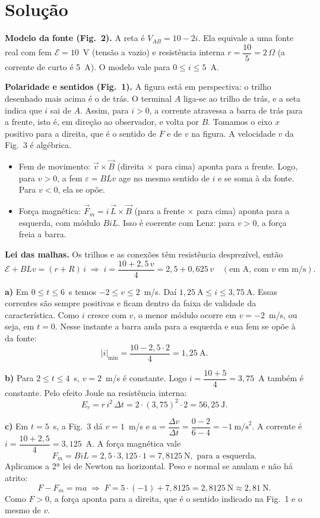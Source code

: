 \documentclass{article}%
\begin{document}
\section*{Solução}

\textbf{Modelo da fonte (Fig.~2).} A reta é $V_{AB}=10-2i$. Ela equivale a uma fonte real com fem $\mathcal{E}=10$~V (tensão a vazio) e resistência interna $r=\dfrac{10}{5}=2\,\Omega$ (a corrente de curto é 5~A). O modelo vale para $0\le i\le 5$~A.

\textbf{Polaridade e sentidos (Fig.~1).} A figura está em perspectiva: o trilho desenhado mais acima é o de trás. O terminal $A$ liga-se ao trilho de trás, e a seta indica que $i$ sai de $A$. Assim, para $i>0$, a corrente atravessa a barra de trás para a frente, isto é, em direção ao observador, e volta por $B$. Tomamos o eixo $x$ positivo para a direita, que é o sentido de $F$ e de $v$ na figura. A velocidade $v$ da Fig.~3 é algébrica.
\begin{itemize}
\item Fem de movimento: $\vec v\times\vec B$ (direita $\times$ para cima) aponta para a frente. Logo, para $v>0$, a fem $\varepsilon=BLv$ age no mesmo sentido de $i$ e se soma à da fonte. Para $v<0$, ela se opõe.
\item Força magnética: $\vec F_m=i\,\vec L\times\vec B$ (para a frente $\times$ para cima) aponta para a esquerda, com módulo $BiL$. Isso é coerente com Lenz: para $v>0$, a força freia a barra.
\end{itemize}
\textbf{Lei das malhas.} Os trilhos e as conexões têm resistência desprezível, então
\[
\mathcal{E}+BLv=(r+R)\,i\;\Rightarrow\; i=\frac{10+2{,}5\,v}{4}=2{,}5+0{,}625\,v \quad (\text{em A, com } v \text{ em m/s}).
\]

\textbf{a)} Em $0\le t\le 6$~s temos $-2\le v\le 2$~m/s. Daí $1{,}25\ \text{A}\le i\le 3{,}75\ \text{A}$. Essas correntes são sempre positivas e ficam dentro da faixa de validade da característica. Como $i$ cresce com $v$, o menor módulo ocorre em $v=-2$~m/s, ou seja, em $t=0$. Nesse instante a barra anda para a esquerda e sua fem se opõe à da fonte:
\[
|i|_{\min}=\frac{10-2{,}5\cdot 2}{4}=1{,}25\ \text{A}.
\]

\textbf{b)} Para $2\le t\le 4$~s, $v=2$~m/s é constante. Logo $i=\dfrac{10+5}{4}=3{,}75$~A também é constante. Pelo efeito Joule na resistência interna:
\[
E_r=r\,i^2\,\Delta t=2\cdot(3{,}75)^2\cdot 2=56{,}25\ \text{J}.
\]

\textbf{c)} Em $t=5$~s, a Fig.~3 dá $v=1$~m/s e $a=\dfrac{\Delta v}{\Delta t}=\dfrac{0-2}{6-4}=-1\ \text{m/s}^2$. A corrente é $i=\dfrac{10+2{,}5}{4}=3{,}125$~A. A força magnética vale
\[
F_m=BiL=2{,}5\cdot 3{,}125\cdot 1=7{,}8125\ \text{N}, \text{ para a esquerda.}
\]
Aplicamos a 2ª lei de Newton na horizontal. Peso e normal se anulam e não há atrito:
\[
F-F_m=ma\;\Rightarrow\;F=5\cdot(-1)+7{,}8125=2{,}8125\ \text{N}\approx 2{,}81\ \text{N}.
\]
Como $F>0$, a força aponta para a direita, que é o sentido indicado na Fig.~1 e o mesmo de $v$.
\end{document}
